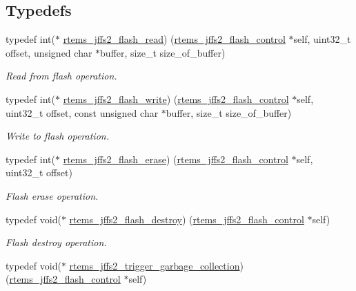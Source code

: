 \subsection*{Typedefs}
\begin{DoxyCompactItemize}
\item 
typedef int($\ast$ \mbox{\hyperlink{group__JFFS2_ga1865e220fec00e764a6284642d2f46df}{rtems\+\_\+jffs2\+\_\+flash\+\_\+read}}) (\mbox{\hyperlink{structrtems__jffs2__flash__control}{rtems\+\_\+jffs2\+\_\+flash\+\_\+control}} $\ast$self, uint32\+\_\+t offset, unsigned char $\ast$buffer, size\+\_\+t size\+\_\+of\+\_\+buffer)
\begin{DoxyCompactList}\small\item\em Read from flash operation. \end{DoxyCompactList}\item 
typedef int($\ast$ \mbox{\hyperlink{group__JFFS2_gaf1353f456ea63b4a2c66881c001e6593}{rtems\+\_\+jffs2\+\_\+flash\+\_\+write}}) (\mbox{\hyperlink{structrtems__jffs2__flash__control}{rtems\+\_\+jffs2\+\_\+flash\+\_\+control}} $\ast$self, uint32\+\_\+t offset, const unsigned char $\ast$buffer, size\+\_\+t size\+\_\+of\+\_\+buffer)
\begin{DoxyCompactList}\small\item\em Write to flash operation. \end{DoxyCompactList}\item 
typedef int($\ast$ \mbox{\hyperlink{group__JFFS2_ga0dd6899e74b1d84287f44dc9296084e9}{rtems\+\_\+jffs2\+\_\+flash\+\_\+erase}}) (\mbox{\hyperlink{structrtems__jffs2__flash__control}{rtems\+\_\+jffs2\+\_\+flash\+\_\+control}} $\ast$self, uint32\+\_\+t offset)
\begin{DoxyCompactList}\small\item\em Flash erase operation. \end{DoxyCompactList}\item 
typedef void($\ast$ \mbox{\hyperlink{group__JFFS2_gad29663a4ea8c8bee3ca505f648dfe564}{rtems\+\_\+jffs2\+\_\+flash\+\_\+destroy}}) (\mbox{\hyperlink{structrtems__jffs2__flash__control}{rtems\+\_\+jffs2\+\_\+flash\+\_\+control}} $\ast$self)
\begin{DoxyCompactList}\small\item\em Flash destroy operation. \end{DoxyCompactList}\item 
typedef void($\ast$ \mbox{\hyperlink{group__JFFS2_ga3abb194d2d804eb99116694f8204afaf}{rtems\+\_\+jffs2\+\_\+trigger\+\_\+garbage\+\_\+collection}}) (\mbox{\hyperlink{structrtems__jffs2__flash__control}{rtems\+\_\+jffs2\+\_\+flash\+\_\+control}} $\ast$self)

\end{DoxyCompactItemize}
